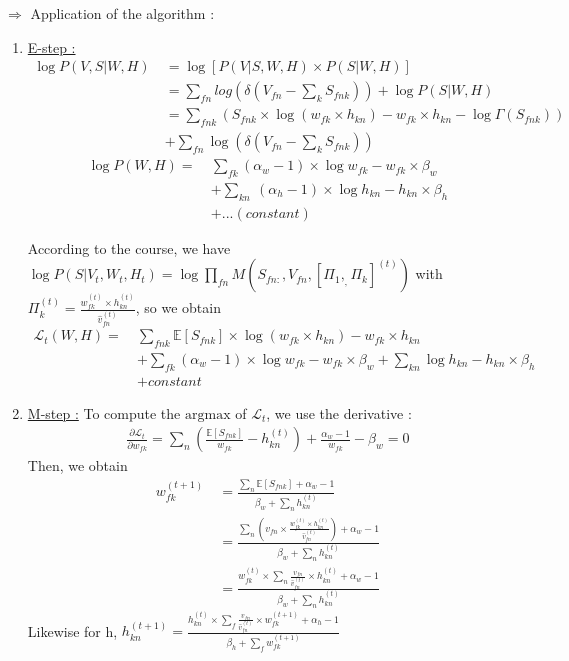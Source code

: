 \documentclass[a4paper,12pt]{article} %
\begin{document}
$\Rightarrow$ Application of the algorithm :
\begin{enumerate}
\item \underline{E-step :}
\begin{align*}
\log P(V,S|W,H) \: &= \log [P(V|S,W,H)\times P(S|W,H)]\\
&= \sum\limits_{fn} log(\delta(V_{fn}-\sum\limits_{k}S_{fnk})) + \log P(S|W,H)\\
&= \sum\limits_{fnk}\left(S_{fnk}\times \log(w_{fk}\times h_{kn})-w_{fk}\times h_{kn}-\log\Gamma(S_{fnk})\right)\\
&+ \sum\limits_{fn}\log\left(\delta(V_{fn}-\sum\limits_{k}S_{fnk})\right)
\end{align*}
\begin{align*}
\log P(W,H) = \: &\sum\limits_{fk} (\alpha_w-1)\times\log w_{fk} - w_{fk}\times\beta_w \\
&+ \sum\limits_{kn} \: (\alpha_h-1)\times\log h_{kn} - h_{kn}\times\beta_h \\
&+ ... (constant)
\end{align*}

According to the course, we have 
$\log P(S|V_t,W_t,H_t)=\log \prod\limits_{fn}M(S_{fn:},V_{fn},[\Pi_1,_,\Pi_k]^{(t)})$
with $\Pi_k^{(t)}=\frac{w_{fk}^{(t)}\times h_{kn}^{(t)}}{\hat{v}_{fn}^{(t)}}$, so we obtain
\begin{align*}
\mathcal{L}_t(W,H) = \: &\sum\limits_{fnk} \mathbb{E}[S_{fnk}]\times\log(w_{fk}\times h_{kn})-w_{fk}\times h_{kn}\\
&+ \sum\limits_{fk}(\alpha_w-1)\times\log w_{fk}-w_{fk}\times\beta_w + \sum\limits_{kn}\log h_{kn}-h_{kn}\times\beta_h\\
&+ constant
\end{align*}
\item \underline{M-step :} To compute the $\mathrm{argmax}$ of $\mathcal{L}_t$, we use the derivative :\\
\begin{align*}
\frac{\partial\mathcal{L}_t}{\partial w_{fk}}=\sum\limits_{n}\left(\frac{\mathbb{E}[S_{fnk}]}{w_{fk}}-h_{kn}^{(t)}\right)+\frac{\alpha_w-1}{w_{fk}}-\beta_w=0
\end{align*}
Then, we obtain
\begin{align*}
w_{fk}^{(t+1)} \: &= \frac{\sum\limits_{n}\mathbb{E}[S_{fnk}]+\alpha_w-1}{\beta_w+\sum\limits_{n}h_{kn}^{(t)}}\\
&= \frac{\sum\limits_{n}\left(v_{fn}\times\frac{w_{fk}^{(t)}\times h_{kn}^{(t)}}{\hat{v}_{fn}^{(t)}}\right)+\alpha_w-1}{\beta_w+\sum\limits_{n}h_{kn}^{(t)}}\\
&= \frac{w_{fk}^{(t)}\times\sum\limits_{n}\frac{v_{fn}}{\hat{v}_{fn}^{(t)}}\times h_{kn}^{(t)}+\alpha_w-1}{\beta_w+\sum\limits_{n}h_{kn}^{(t)}}
\end{align*}
Likewise for h,
$h_{kn}^{(t+1)}=\frac{h_{kn}^{(t)}\times\sum\limits_{f}\frac{v_{fn}}{\hat{v}_{fn}^{(t)}}\times w_{fk}^{(t+1)}+\alpha_h-1}{\beta_h+\sum\limits_{f}w_{fk}^{(t+1)}}$
\end{enumerate}
\end{document}
